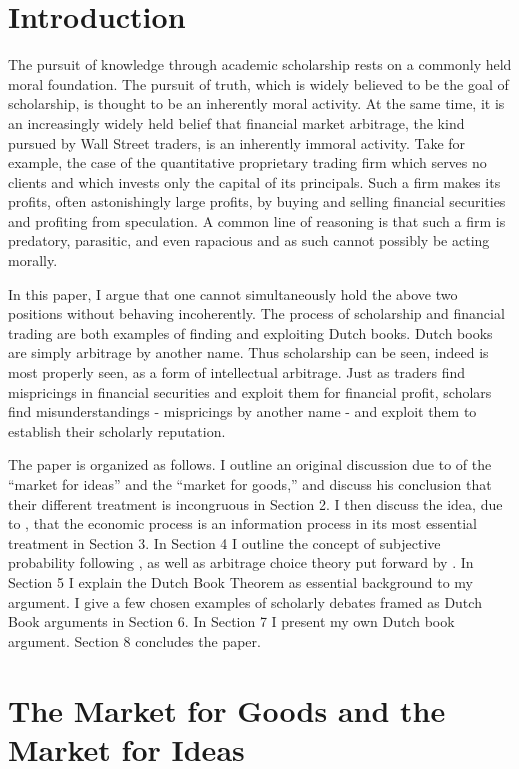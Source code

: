 \documentclass[11pt,]{article}
\begin{document}
\section{Introduction}\label{introduction}

The pursuit of knowledge through academic scholarship rests on a
commonly held moral foundation. The pursuit of truth, which is widely
believed to be the goal of scholarship, is thought to be an inherently
moral activity. At the same time, it is an increasingly widely held
belief that financial market arbitrage, the kind pursued by Wall Street
traders, is an inherently immoral activity. Take for example, the case
of the quantitative proprietary trading firm which serves no clients and
which invests only the capital of its principals. Such a firm makes its
profits, often astonishingly large profits, by buying and selling
financial securities and profiting from speculation. A common line of
reasoning is that such a firm is predatory, parasitic, and even
rapacious and as such cannot possibly be acting morally.

In this paper, I argue that one cannot simultaneously hold the above two
positions without behaving incoherently. The process of scholarship and
financial trading are both examples of finding and exploiting Dutch
books. Dutch books are simply arbitrage by another name. Thus
scholarship can be seen, indeed is most properly seen, as a form of
intellectual arbitrage. Just as traders find mispricings in financial
securities and exploit them for financial profit, scholars find
misunderstandings - mispricings by another name - and exploit them to
establish their scholarly reputation.

The paper is organized as follows. I outline an original discussion due
to \citet{Coase1974} of the ``market for ideas'' and the ``market for
goods,'' and discuss his conclusion that their different treatment is
incongruous in Section 2. I then discuss the idea, due to
\citet{Hayek1945}, that the economic process is an information process
in its most essential treatment in Section 3. In Section 4 I outline the
concept of subjective probability following \citet{deFinetti1937}, as
well as arbitrage choice theory put forward by \citet{Nau1999}. In
Section 5 I explain the Dutch Book Theorem as essential background to my
argument. I give a few chosen examples of scholarly debates framed as
Dutch Book arguments in Section 6. In Section 7 I present my own Dutch
book argument. Section 8 concludes the paper.

\section{The Market for Goods and the Market for
Ideas}\label{the-market-for-goods-and-the-market-for-ideas}
\end{document}
